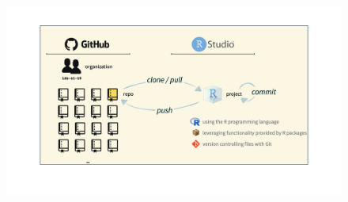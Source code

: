 \documentclass[11pt]{beamer}
\begin{document}
\begin{frame}
\begin{figure}
\begin{overprint}
			\centering\includegraphics[width=1\linewidth]{Images/S1/whole-game-04}
		\end{overprint}
	\end{figure}
	
\end{frame}

\end{document}
